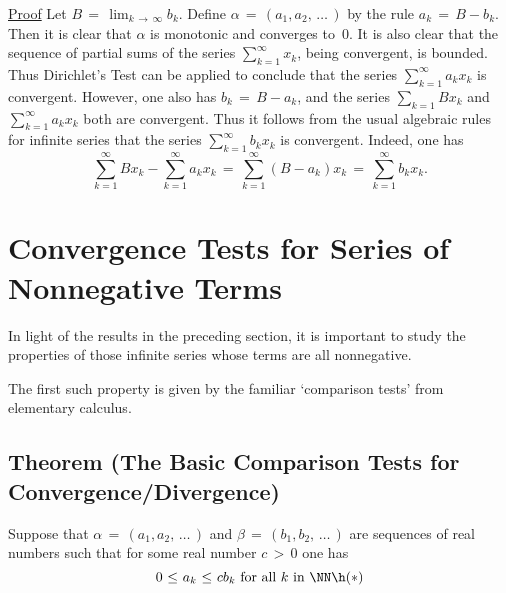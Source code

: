         \underline{Proof} Let $B \,=\, \lim_{k \,{\rightarrow}\, {\infty}} b_{k}$.
    Define ${\alpha} \,=\, (a_{1},a_{2},\,{\ldots}\,)$ by the rule $a_{k} \,=\, B-b_{k}$.
    Then it is clear that ${\alpha}$ is monotonic and converges to~$0$. It is also clear that the sequence of partial sums of the series $\sum_{k=1}^{{\infty}} x_{k}$, being convergent, is bounded.
    Thus Dirichlet's Test can be applied to conclude that the series $\sum_{k=1}^{{\infty}} a_{k}x_{k}$ is convergent. However, one also has $b_{k} \,=\, B - a_{k}$, and the series $\sum_{k=1} Bx_{k}$ and $\sum_{k=1}^{{\infty}} a_{k}x_{k}$ both are convergent.
    Thus it follows from the usual algebraic rules for infinite series that the series $\sum_{k=1}^{{\infty}} b_{k}x_{k}$ is convergent. Indeed, one has
        \begin{displaymath}
        \sum_{k=1}^{{\infty}} Bx_{k} - \sum_{k=1}^{{\infty}} a_{k}x_{k} \,=\, 
    \sum_{k=1}^{{\infty}} (B-a_{k})x_{k} \,=\, \sum_{k=1}^{{\infty}} b_{k}x_{k}.
        \end{displaymath} 
    

                \section{{\bf Convergence Tests for Series of Nonnegative Terms}}
                \label{SectG50}

\V

        In light of the results in the preceding section, it is important to study the properties of those infinite series whose terms are all nonnegative.

        The first such property is given by the familiar `comparison tests' from elementary calculus.

\V

        \subsection{\small{{\bf Theorem}} (The Basic Comparison Tests for Convergence/Divergence)}
        \label{ThmG50.10}

\V

        Suppose that ${\alpha} \,=\, (a_{1},a_{2},\,{\ldots}\,)$ and ${\beta} \,=\, (b_{1},b_{2},\,{\ldots}\,)$ are sequences of real numbers such that for some real number $c\,>\,0$ one has
        \begin{displaymath}
        0\,\,{\leq}\,\,a_{k}\,\,{\leq}\,\,cb_{k} \mbox{ for all $k$ in ${\NN}$} \h ({\ast})
        \end{displaymath}

